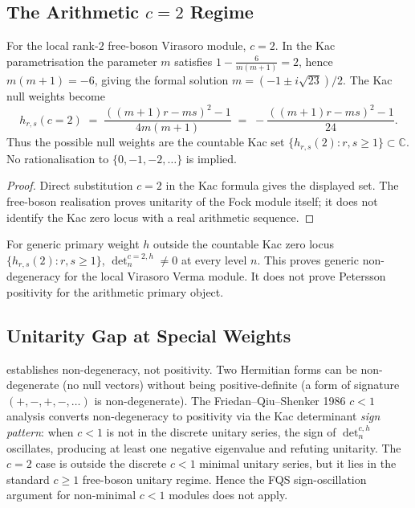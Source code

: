 \subsection{The Arithmetic \(c=2\) Regime}
\label{v4-arith:vb:c=2-regime}

\begin{proposition}[Kac at \(c=2\)]
\label{v4-arith:vb:prop:kac-non-vanishing}
For the local rank-\(2\) free-boson Virasoro
module, \(c=2\). In the Kac parametrisation the parameter \(m\)
satisfies
\(1-\tfrac{6}{m(m+1)}=2\), hence \(m(m+1)=-6\), giving the formal
solution \(m=(-1\pm i\sqrt{23})/2\). The Kac null weights become
\begin{equation}
h_{r,s}(c=2)\;=\;\frac{((m+1)r-ms)^{2}-1}{4m(m+1)}\;=\;-\frac{((m+1)r-ms)^{2}-1}{24}.
\end{equation}
Thus the possible null weights are the countable Kac set
\(\{h_{r,s}(2):r,s\geq1\}\subset\mathbb{C}\). No rationalisation to
\(\{0,-1,-2,\ldots\}\) is implied.
\end{proposition}

\begin{proof}
Direct substitution \(c=2\) in the Kac formula gives the displayed
set. The free-boson realisation proves unitarity of the Fock module
itself; it does not identify the Kac zero locus with a real arithmetic
sequence.
\end{proof}

\begin{corollary}
\label{v4-arith:vb:cor:no-generic-null}
For generic primary weight \(h\) outside the
countable Kac zero locus \(\{h_{r,s}(2):r,s\geq1\}\),
\(\det_{n}^{c=2,h}\neq 0\) at every level \(n\). This proves generic
non-degeneracy for the local Virasoro Verma module. It does not prove
Petersson positivity for the arithmetic primary object.
\end{corollary}

\subsection{Unitarity Gap at Special Weights}
\label{v4-arith:vb:unitarity-gap}

\begin{remark}
\label{v4-arith:vb:rem:gap}
 establishes non-degeneracy,
not positivity. Two Hermitian forms can be non-degenerate (no null
vectors) without being positive-definite (a form of signature
\((+,-,+,-,\ldots)\) is non-degenerate). The Friedan--Qiu--Shenker 1986
\(c<1\) analysis converts non-degeneracy to positivity via the
Kac determinant \emph{sign pattern}: when \(c<1\) is not in the
discrete unitary series, the sign of \(\det_{n}^{c,h}\) oscillates,
producing at least one negative eigenvalue and refuting unitarity.
The \(c=2\) case is outside the discrete \(c<1\) minimal unitary series,
but it lies in the standard \(c\geq1\) free-boson unitary regime. Hence
the FQS sign-oscillation argument for non-minimal \(c<1\) modules does
not apply.
\end{remark}

